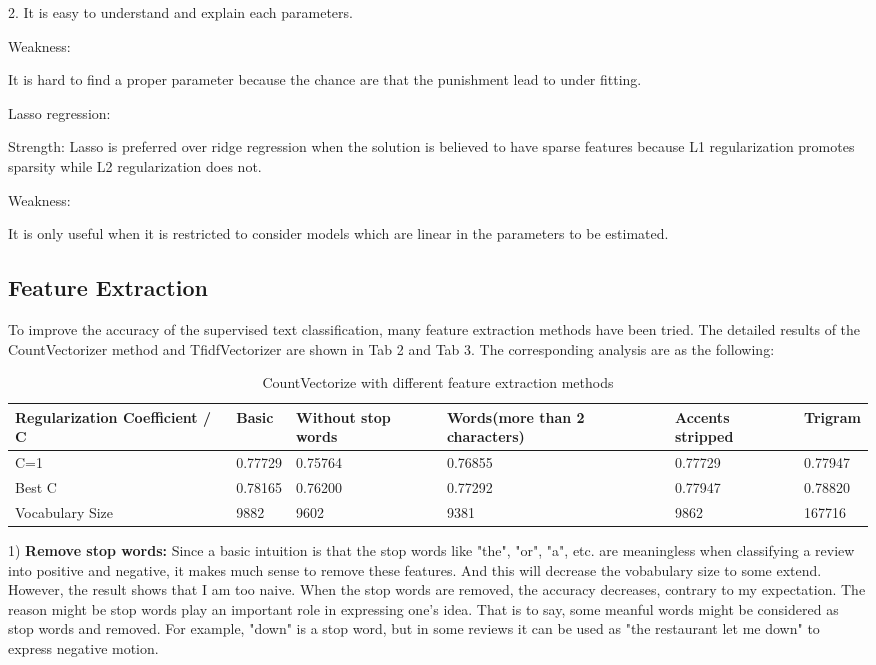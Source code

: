 \documentclass[letterpaper, 10 pt, conference]{ieeeconf}  %
\begin{document}
2. It is easy to understand and explain each parameters.

Weakness:

It is hard to find a proper parameter because the chance are that the punishment lead to under fitting.

Lasso regression:

Strength:
Lasso is preferred over ridge regression when the solution is believed to have sparse features because L1 regularization promotes sparsity while L2 regularization does not.

Weakness:

It is only useful when it is restricted to consider models which are linear in the parameters to be estimated.

\subsection{Feature Extraction}
To improve the accuracy of the supervised text classification, many feature extraction methods have been tried. The detailed results of the CountVectorizer method and TfidfVectorizer are shown in Tab 2 and Tab 3. The corresponding analysis are as the following:

\begin{table}[htb]
	\caption{CountVectorize with different feature extraction methods}  
	\begin{center}  
		\begin{tabu} to 1\textwidth{X[3,c]|X[1,b]|X[2,l]|X[3,c]|X[2,m]|X[1,c]}  
			\hline  
			Regularization Coefficient / C  &Basic             &Without stop words      &Words(more than 2 characters)    &Accents stripped     &Trigram\\  
			\hline  
			C=1    &0.77729       &0.75764           &0.76855    &0.77729      &0.77947\\  
			Best C    &0.78165      &0.76200           &0.77292    &0.77947      &0.78820\\  
			Vocabulary Size    &9882      &9602           &9381   &9862      &167716\\  
			
			\hline  
		\end{tabu}  
	\end{center}  
\end{table} 

1) \textbf{Remove stop words: }Since a basic intuition is that the stop words like "the", "or", "a", etc. are meaningless when classifying a review into positive and negative, it makes much sense to remove these features. And this will decrease the vobabulary size to some extend. However, the result shows that I am too naive. When the stop words are removed, the accuracy decreases, contrary to my expectation. The reason might be stop words play an important role in expressing one's idea. That is to say, some meanful words might be considered as stop words and removed. For example, "down" is a stop word, but in some reviews it can be used as "the restaurant let me down" to express negative motion.
\end{document}
